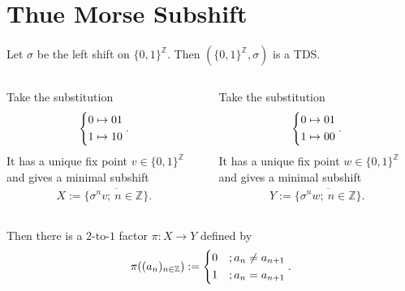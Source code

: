 \section{Thue Morse Subshift}

\begin{frame}
	Let $\sigma$ be the left shift on $\{0, 1\}^\mathbb{Z}$. Then $(\{0, 1\}^\mathbb{Z}, \sigma)$ is a TDS.
	\begin{columns}
		\begin{column}{.5\textwidth}
			\begin{example}
				Take the substitution
				\begin{align*}
					\begin{dcases}
						0 \mapsto 01\\
						1 \mapsto 10
					\end{dcases}.
				\end{align*}
				It has a unique fix point $v \in \{0, 1\}^\mathbb{Z}$ and gives a minimal subshift
				\begin{align*}
					X := \overline{\{\sigma^nv;\ n \in \mathbb{Z}\}}.
				\end{align*}
			\end{example}
		\end{column}
		\begin{column}{.5\textwidth}
			\begin{example}
				Take the substitution
				\begin{align*}
					\begin{dcases}
						0 \mapsto 01\\
						1 \mapsto 00
					\end{dcases}.
				\end{align*}
				It has a unique fix point $w \in \{0, 1\}^\mathbb{Z}$ and gives a minimal subshift
				\begin{align*}
					Y := \overline{\{\sigma^nw;\ n \in \mathbb{Z}\}}.
				\end{align*}
			\end{example}
		\end{column}
	\end{columns}
	\medskip

	Then there is a $2$-to-$1$ factor $\pi: X \to Y$ defined by
	\begin{align*}
		\pi((a_n)_{n \in \mathbb{Z}}) :=
		\begin{dcases}
			0 &; a_n \neq a_{n+1}\\
			1 &; a_n = a_{n+1}
		\end{dcases}.
	\end{align*} 
\end{frame}

